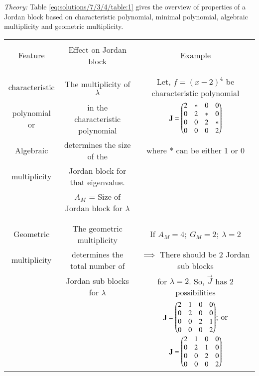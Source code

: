 %
{\em Theory: }
Table \ref{eq:solutions/7/3/4/table:1} gives the overview of properties of a Jordan block based on characteristic polynomial, minimal polynomial, algebraic multiplicity and geometric multiplicity.
\begin{table*}[!ht]
\begin{center}
\begin{tabular}{|c|c|c|}
\hline
& &\\
Feature & Effect on Jordan block & Example\\
& &\\
\hline

& &\\
characteristic & The multiplicity of $\lambda$ & Let, $f = (x-2)^4$ be characteristic polynomial\\
polynomial or & in the characteristic polynomial & $\mathbf{J} = \begin{pmatrix}2 & * & 0 & 0 \\ 0 & 2 & * & 0 \\ 0 & 0 & 2 & * \\ 0 & 0 & 0 & 2\end{pmatrix}$\\
Algebraic & determines the size of the & where $*$ can be either 1 or 0\\
multiplicity & Jordan block for that eigenvalue.&\\
& $A_M$ = Size of Jordan block for $\lambda$& \\
& &\\
\hline

& & \\
Geometric & The geometric multiplicity & If $A_M = 4; \: G_M = 2; \: \lambda = 2$\\
multiplicity & determines the total number of & $\implies$ There should be 2 Jordan sub blocks\\ 
& Jordan sub blocks for $\lambda$ & for $\lambda = 2$. So, $\vec{J}$ has 2 possibilities\\
& & $\mathbf{J} = \begin{pmatrix}2 & 1 & 0 & 0 \\ 0 & 2 & 0 & 0 \\ 0 & 0 & 2 & 1 \\ 0 & 0 & 0 & 2\end{pmatrix}$;\: or $\mathbf{J} = \begin{pmatrix}2 & 1 & 0 & 0 \\ 0 & 2 & 1 & 0 \\ 0 & 0 & 2 & 0 \\ 0 & 0 & 0 & 2\end{pmatrix}$\\
\hline


\end{tabular}
\end{center}
\end{table*}
